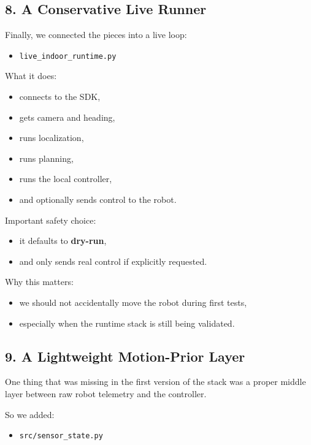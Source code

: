 \documentclass[11pt,a4paper]{article}
\begin{document}
\subsection{8. A Conservative Live Runner}

Finally, we connected the pieces into a live loop:

\begin{itemize}[nosep]
  \item \texttt{live\_indoor\_runtime.py}
\end{itemize}

What it does:

\begin{itemize}[nosep]
  \item connects to the SDK,
  \item gets camera and heading,
  \item runs localization,
  \item runs planning,
  \item runs the local controller,
  \item and optionally sends control to the robot.
\end{itemize}

Important safety choice:

\begin{itemize}[nosep]
  \item it defaults to \textbf{dry-run},
  \item and only sends real control if explicitly requested.
\end{itemize}

Why this matters:

\begin{itemize}[nosep]
  \item we should not accidentally move the robot during first tests,
  \item especially when the runtime stack is still being validated.
\end{itemize}


\subsection{9. A Lightweight Motion-Prior Layer}

One thing that was missing in the first version of the stack was a proper
middle layer between raw robot telemetry and the controller.

So we added:

\begin{itemize}[nosep]
  \item \texttt{src/sensor\_state.py}
\end{itemize}
\end{document}
